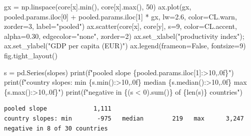 \documentclass[
  letterpaper,
  10pt,
  twoside,
  openright,
  numbers=noenddot,
  chapterprefix=true]{scrbook}
\newenvironment{Shaded}{}{}
\newcommand{\BuiltInTok}[1]{\textcolor[rgb]{0.84,0.23,0.29}{#1}}
\newcommand{\DecValTok}[1]{\textcolor[rgb]{0.00,0.36,0.77}{#1}}
\newcommand{\FloatTok}[1]{\textcolor[rgb]{0.00,0.36,0.77}{#1}}
\newcommand{\NormalTok}[1]{\textcolor[rgb]{0.14,0.16,0.18}{#1}}
\newcommand{\OperatorTok}[1]{\textcolor[rgb]{0.14,0.16,0.18}{#1}}
\newcommand{\SpecialCharTok}[1]{\textcolor[rgb]{0.00,0.36,0.77}{#1}}
\newcommand{\SpecialStringTok}[1]{\textcolor[rgb]{0.01,0.18,0.38}{#1}}
\newcommand{\StringTok}[1]{\textcolor[rgb]{0.01,0.18,0.38}{#1}}
\newcommand{\VariableTok}[1]{\textcolor[rgb]{0.89,0.38,0.04}{#1}}
\begin{document}
\begin{Shaded}
\begin{Highlighting}[]
\NormalTok{gx }\OperatorTok{=}\NormalTok{ np.linspace(core[x].}\BuiltInTok{min}\NormalTok{(), core[x].}\BuiltInTok{max}\NormalTok{(), }\DecValTok{50}\NormalTok{)}
\NormalTok{ax.plot(gx, pooled.params.iloc[}\DecValTok{0}\NormalTok{] }\OperatorTok{+}\NormalTok{ pooled.params.iloc[}\DecValTok{1}\NormalTok{] }\OperatorTok{*}\NormalTok{ gx,}
\NormalTok{        lw}\OperatorTok{=}\FloatTok{2.6}\NormalTok{, color}\OperatorTok{=}\NormalTok{CL.warn, zorder}\OperatorTok{=}\DecValTok{3}\NormalTok{, label}\OperatorTok{=}\StringTok{"pooled"}\NormalTok{)}
\NormalTok{ax.scatter(core[x], core[y], s}\OperatorTok{=}\DecValTok{9}\NormalTok{, color}\OperatorTok{=}\NormalTok{CL.accent, alpha}\OperatorTok{=}\FloatTok{0.30}\NormalTok{,}
\NormalTok{           edgecolor}\OperatorTok{=}\StringTok{"none"}\NormalTok{, zorder}\OperatorTok{=}\DecValTok{2}\NormalTok{)}
\NormalTok{ax.set\_xlabel(}\StringTok{"productivity index"}\NormalTok{)}\OperatorTok{;}\NormalTok{ ax.set\_ylabel(}\StringTok{"GDP per capita (EUR)"}\NormalTok{)}
\NormalTok{ax.legend(frameon}\OperatorTok{=}\VariableTok{False}\NormalTok{, fontsize}\OperatorTok{=}\DecValTok{9}\NormalTok{)}
\NormalTok{fig.tight\_layout()}

\NormalTok{s }\OperatorTok{=}\NormalTok{ pd.Series(slopes)}
\BuiltInTok{print}\NormalTok{(}\SpecialStringTok{f"pooled slope        }\SpecialCharTok{\{}\NormalTok{pooled}\SpecialCharTok{.}\NormalTok{params}\SpecialCharTok{.}\NormalTok{iloc[}\DecValTok{1}\NormalTok{]}\SpecialCharTok{:\textgreater{}10,.0f\}}\SpecialStringTok{"}\NormalTok{)}
\BuiltInTok{print}\NormalTok{(}\SpecialStringTok{f"country slopes: min }\SpecialCharTok{\{}\NormalTok{s}\SpecialCharTok{.}\BuiltInTok{min}\NormalTok{()}\SpecialCharTok{:\textgreater{}10,.0f\}}\SpecialStringTok{   median }\SpecialCharTok{\{}\NormalTok{s}\SpecialCharTok{.}\NormalTok{median()}\SpecialCharTok{:\textgreater{}10,.0f\}}\SpecialStringTok{   max }\SpecialCharTok{\{}\NormalTok{s}\SpecialCharTok{.}\BuiltInTok{max}\NormalTok{()}\SpecialCharTok{:\textgreater{}10,.0f\}}\SpecialStringTok{"}\NormalTok{)}
\BuiltInTok{print}\NormalTok{(}\SpecialStringTok{f"negative in }\SpecialCharTok{\{}\NormalTok{(s }\OperatorTok{\textless{}} \DecValTok{0}\NormalTok{)}\SpecialCharTok{.}\BuiltInTok{sum}\NormalTok{()}\SpecialCharTok{\}}\SpecialStringTok{ of }\SpecialCharTok{\{}\BuiltInTok{len}\NormalTok{(s)}\SpecialCharTok{\}}\SpecialStringTok{ countries"}\NormalTok{)}
\end{Highlighting}
\end{Shaded}

\begin{verbatim}
pooled slope             1,111
country slopes: min       -975   median        219   max      3,247
negative in 8 of 30 countries
\end{verbatim}
\end{document}
